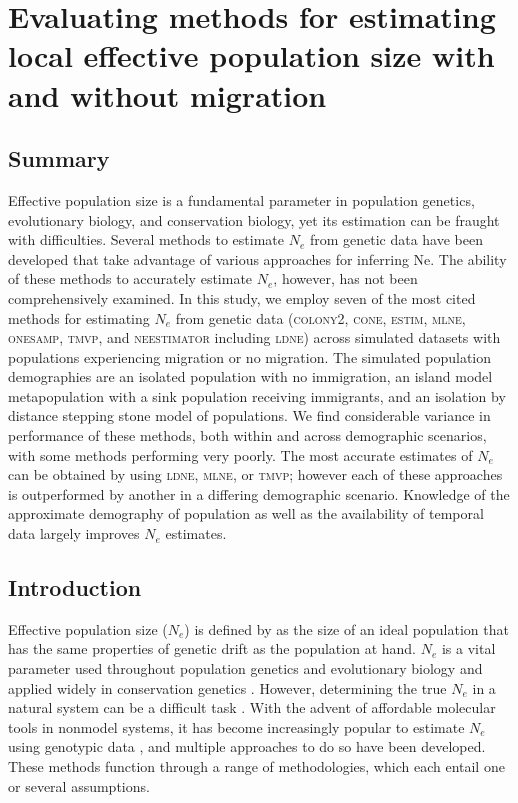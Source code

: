 \chapter{Evaluating methods for estimating local effective population size with and without migration}
\label{chap:effectivepopsize}

\section{Summary}

Effective population size is a fundamental parameter in population genetics, evolutionary 
biology, and conservation biology, yet its estimation can be fraught with difficulties. 
Several methods to estimate $N_e$ from genetic data have been developed that take 
advantage of various approaches for inferring Ne. The ability of these methods to accurately 
estimate $N_e$, however, has not been comprehensively examined. In this study, we 
employ seven of the most cited methods for estimating $N_e$ from genetic data 
(\textsc{colony2}, \textsc{cone}, \textsc{estim}, \textsc{mlne}, \textsc{onesamp}, \textsc{tmvp}, 
and \textsc{neestimator} including \textsc{ldne}) across simulated datasets with populations 
experiencing migration or no migration. The simulated population demographies are an isolated 
population with no immigration, an island model metapopulation with a sink population receiving 
immigrants, and an isolation by distance stepping stone model of populations. We find considerable 
variance in performance of these methods, both within and across demographic scenarios, with 
some methods performing very poorly. The most accurate estimates of $N_e$ can be 
obtained by using \textsc{ldne}, \textsc{mlne}, or \textsc{tmvp}; however each of these 
approaches is outperformed by another in a differing demographic scenario. Knowledge of the 
approximate demography of population as well as the availability of temporal data largely 
improves $N_e$ estimates.

\section{Introduction}
Effective population size ($N_e$) is defined by \citet{Wright:1931} as the size of 
an ideal population that has the same properties of genetic drift as the population at hand. 
$N_e$ is a vital parameter used throughout population genetics and evolutionary 
biology and applied widely in conservation genetics \citep{Schwartz:2007, Dudgeon:2012}. 
However, determining the true $N_e$ in a natural system can be a difficult task 
\citep{Serbezov:2012, Theunert:2012}. With the advent of affordable molecular tools 
in nonmodel systems, it has become increasingly popular to estimate $N_e$ using genotypic 
data \citep{Wang:2005, Palstra:2012}, and multiple approaches to do so have been developed. 
These methods function through a range of methodologies, which each entail one or several assumptions.


